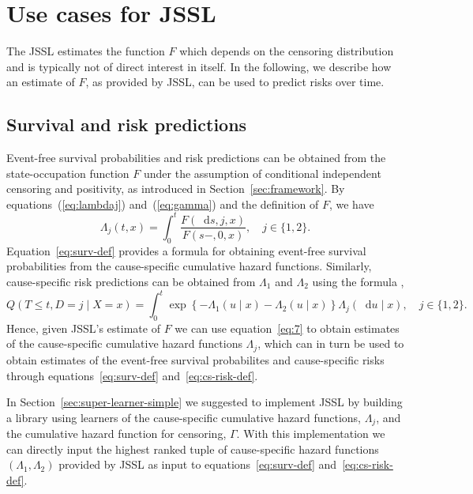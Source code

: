 \documentclass[a4paper,danish]{article}
\theoremstyle{plain} %
\numberwithin{theorem}{section}
\theoremstyle{definition} %
\theoremstyle{remark}
\newcommand*\diff{\mathop{}\!\mathrm{d}}
\newcommand{\1}{\mathds{1}}
\begin{document}
\section{Use cases for JSSL}
\label{sec:use-cases-state}
The JSSL estimates the function \( F \) which depends on the
censoring distribution and is typically not of direct interest in
itself. In the following, we describe how an estimate of \( F \), as
provided by JSSL, can be used to predict risks over time.

\subsection{Survival and risk predictions}
\label{sec:surv-risk-pred}

Event-free survival probabilities and risk predictions can be
obtained from the state-occupation function \( F \) under the
assumption of conditional independent censoring and
positivity, as introduced in Section~\ref{sec:framework}. By
equations~(\ref{eq:lambdaj}) and~(\ref{eq:gamma}) and the
definition of \( F \), we have
\begin{equation}
  \label{eq:7}
  \Lambda_j(t , x) 
  = \int_0^t  \frac{F(\diff s, j, x )}{F(s-, 0, x )},
  \quad j \in \{1,2\}.
\end{equation}
Equation~\eqref{eq:surv-def} provides a formula for obtaining
event-free survival probabilities from the cause-specific
cumulative hazard functions. Similarly, cause-specific risk
predictions can be obtained from \( \Lambda_1 \) and
$\Lambda_2$ using the formula
\citep[e.g.,][]{benichou1990estimates,
  ozenne2017riskregression},
\begin{equation}
  \label{eq:cs-risk-def}
  Q(T \leq t, D = j \mid X=x) =
  \int_0^t \exp\left\{-\Lambda_{1}(u \mid x)-\Lambda_{2}(u
    \mid x)\right\}  \Lambda_j(\diff u \mid x),
  \quad j \in \{1,2\}.
\end{equation}
Hence, given JSSL's estimate of \( F \) we can
use equation~\eqref{eq:7} to obtain estimates of the
cause-specific cumulative hazard functions $\Lambda_j$, which
can in turn be used to obtain estimates of the event-free
survival probabilites and cause-specific risks through
equations~\eqref{eq:surv-def} and~\eqref{eq:cs-risk-def}.

In Section~\ref{sec:super-learner-simple} we suggested to
implement JSSL by building a library using
learners of the cause-specific cumulative hazard functions,
$\Lambda_j$, and the cumulative hazard function for censoring,
$\Gamma$. With this implementation we can directly input the
highest ranked tuple of cause-specific hazard functions
$(\Lambda_1, \Lambda_2)$ provided by JSSL as
input to equations~\eqref{eq:surv-def}
and~\eqref{eq:cs-risk-def}.
\end{document}
